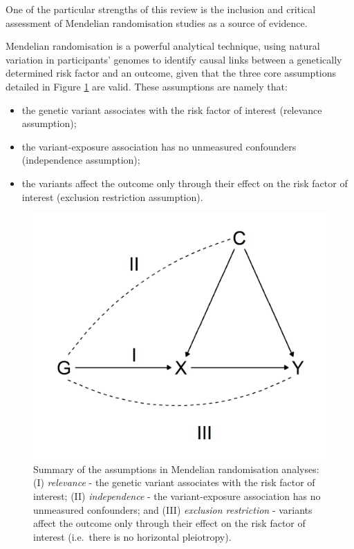 \documentclass[a4paper, twoside]{templates/ociamthesis}
\providecommand{\tightlist}{%
  \setlength{\itemsep}{0pt}\setlength{\parskip}{0pt}}
\begin{document}
One of the particular strengths of this review is the inclusion and critical assessment of Mendelian randomisation studies as a source of evidence.

Mendelian randomisation is a powerful analytical technique, using natural variation in participants' genomes to identify causal links between a genetically determined risk factor and an outcome, given that the three core assumptions detailed in Figure \ref{fig:mrAssumptions} are valid. These assumptions are namely that:

\begin{itemize}
\tightlist
\item
  the genetic variant associates with the risk factor of interest (relevance assumption);
\item
  the variant-exposure association has no unmeasured confounders (independence assumption);
\item
  the variants affect the outcome only through their effect on the risk factor of interest (exclusion restriction assumption).
\end{itemize}





\begin{figure}[H]

{\centering \includegraphics[width=0.7\linewidth]{figures/sys-rev/mrAssumptions} 

}

\caption[Overview of assumptions in Mendelian randomisation analyses]{Summary of the assumptions in Mendelian randomisation analyses: (I) \emph{relevance} - the genetic variant associates with the risk factor of interest; (II) \emph{independence} - the variant-exposure association has no unmeasured confounders; and (III) \emph{exclusion restriction} - variants affect the outcome only through their effect on the risk factor of interest (i.e.~there is no horizontal pleiotropy).}\label{fig:mrAssumptions}
\end{figure}
\end{document}
